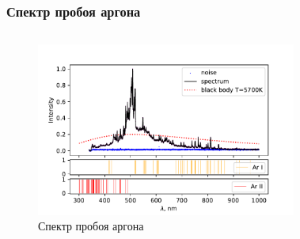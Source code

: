 \documentclass{beamer}
\begin{document}
	\begin{frame}
		\frametitle{Спектр пробоя аргона}
		\begin{columns}
			\begin{figure}
				\centering
				\includegraphics[width=1.1\linewidth]{gen/ar_lines.pdf}
				\caption*{Спектр пробоя аргона}
			\end{figure}	
			\begin{figure}
				\centering

\end{figure}
\end{columns}
\end{frame}
\end{document}
